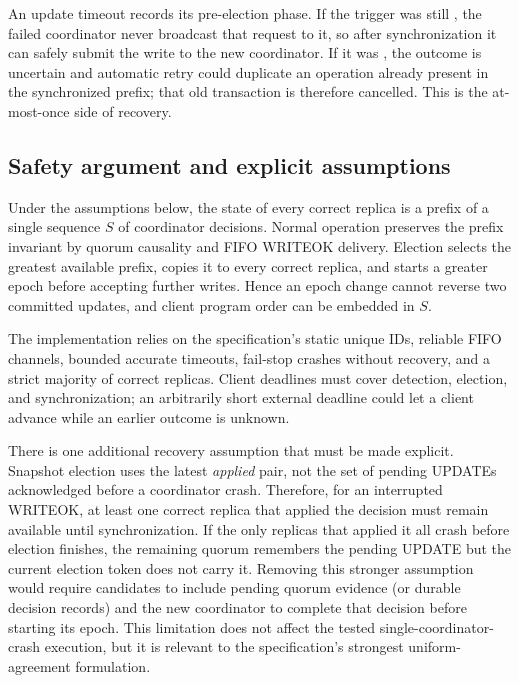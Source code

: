 An update timeout records its pre-election phase. If the trigger was still , the failed coordinator never broadcast that request to it, so after synchronization it can safely submit the write to the new coordinator. If it was , the outcome is uncertain and automatic retry could duplicate an operation already present in the synchronized prefix; that old transaction is therefore cancelled. This is the at-most-once side of recovery.

\subsection{Safety argument and explicit assumptions}

Under the assumptions below, the state of every correct replica is a prefix of a single sequence $S$ of coordinator decisions. Normal operation preserves the prefix invariant by quorum causality and FIFO WRITEOK delivery. Election selects the greatest available prefix, copies it to every correct replica, and starts a greater epoch before accepting further writes. Hence an epoch change cannot reverse two committed updates, and client program order can be embedded in $S$.

The implementation relies on the specification's static unique IDs, reliable FIFO channels, bounded accurate timeouts, fail-stop crashes without recovery, and a strict majority of correct replicas. Client deadlines must cover detection, election, and synchronization; an arbitrarily short external deadline could let a client advance while an earlier outcome is unknown.

There is one additional recovery assumption that must be made explicit. Snapshot election uses the latest \emph{applied} pair, not the set of pending UPDATEs acknowledged before a coordinator crash. Therefore, for an interrupted WRITEOK, at least one correct replica that applied the decision must remain available until synchronization. If the only replicas that applied it all crash before election finishes, the remaining quorum remembers the pending UPDATE but the current election token does not carry it. Removing this stronger assumption would require candidates to include pending quorum evidence (or durable decision records) and the new coordinator to complete that decision before starting its epoch. This limitation does not affect the tested single-coordinator-crash execution, but it is relevant to the specification's strongest uniform-agreement formulation.
